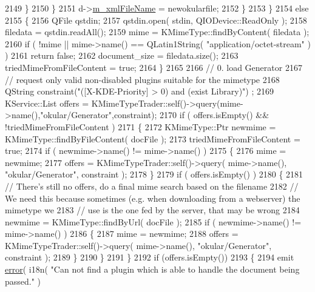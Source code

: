 \begin{DoxyCode}
2149                 \}
2150             \}
2151             d->\hyperlink{classOkular_1_1DocumentPrivate_aae08e3c4d234247bf3d52608649e7c64}{m\_xmlFileName} = newokularfile;
2152         \}
2153     \}
2154     \textcolor{keywordflow}{else}
2155     \{
2156         QFile qstdin;
2157         qstdin.open( stdin, QIODevice::ReadOnly );
2158         filedata = qstdin.readAll();
2159         mime = KMimeType::findByContent( filedata );
2160         \textcolor{keywordflow}{if} ( !mime || mime->name() == QLatin1String( \textcolor{stringliteral}{"application/octet-stream"} ) )
2161             \textcolor{keywordflow}{return} \textcolor{keyword}{false};
2162         document\_size = filedata.size();
2163         triedMimeFromFileContent = \textcolor{keyword}{true};
2164     \}
2165 
2166     \textcolor{comment}{// 0. load Generator}
2167     \textcolor{comment}{// request only valid non-disabled plugins suitable for the mimetype}
2168     QString constraint(\textcolor{stringliteral}{"([X-KDE-Priority] > 0) and (exist Library)"}) ;
2169     KService::List offers = KMimeTypeTrader::self()->query(mime->name(),\textcolor{stringliteral}{"okular/Generator"},constraint);
2170     \textcolor{keywordflow}{if} ( offers.isEmpty() && !triedMimeFromFileContent )
2171     \{
2172         KMimeType::Ptr newmime = KMimeType::findByFileContent( docFile );
2173         triedMimeFromFileContent = \textcolor{keyword}{true};
2174         \textcolor{keywordflow}{if} ( newmime->name() != mime->name() )
2175         \{
2176             mime = newmime;
2177             offers = KMimeTypeTrader::self()->query( mime->name(), \textcolor{stringliteral}{"okular/Generator"}, constraint );
2178         \}
2179         \textcolor{keywordflow}{if} ( offers.isEmpty() )
2180         \{
2181             \textcolor{comment}{// There's still no offers, do a final mime search based on the filename}
2182             \textcolor{comment}{// We need this because sometimes (e.g. when downloading from a webserver) the mimetype we}
2183             \textcolor{comment}{// use is the one fed by the server, that may be wrong}
2184             newmime = KMimeType::findByUrl( docFile );
2185             \textcolor{keywordflow}{if} ( newmime->name() != mime->name() )
2186             \{
2187                 mime = newmime;
2188                 offers = KMimeTypeTrader::self()->query( mime->name(), \textcolor{stringliteral}{"okular/Generator"}, constraint );
2189             \}
2190         \}
2191     \}
2192     \textcolor{keywordflow}{if} (offers.isEmpty())
2193     \{
2194         emit \hyperlink{classOkular_1_1Document_a0f6dbe3d679e96b2b91f9b467d12d251}{error}( i18n( \textcolor{stringliteral}{"Can not find a plugin which is able to handle the document being passed."} )

\end{DoxyCode}
